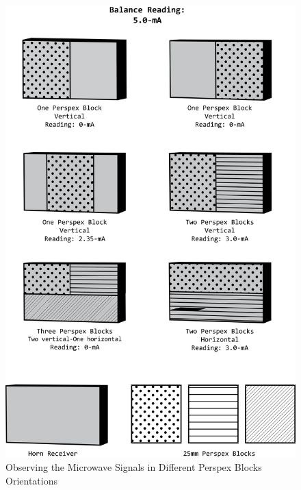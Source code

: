 \documentclass[a4paper,12pt]{report}
\begin{document}
\begin{figure}
\centering
\includegraphics[width=1.0\linewidth, height=0.95\textheight]{"Exp7 Perspex Blocks"}
\caption{Observing the Microwave Signals in Different Perspex Blocks Orientations}
\label{fig:Exp7PerspexBlocks}
\end{figure}
\end{document}
